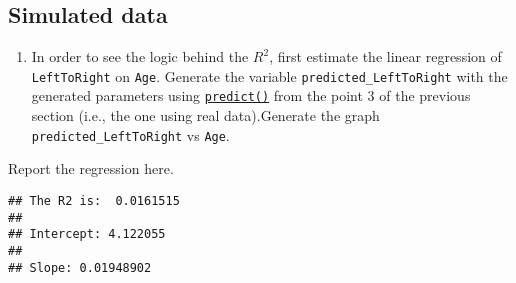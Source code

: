 \documentclass[
]{book}
\newenvironment{Shaded}{\begin{snugshade}}{\end{snugshade}}
\newcommand{\AttributeTok}[1]{\textcolor[rgb]{0.13,0.29,0.53}{#1}}
\newcommand{\DecValTok}[1]{\textcolor[rgb]{0.00,0.00,0.81}{#1}}
\newcommand{\FunctionTok}[1]{\textcolor[rgb]{0.13,0.29,0.53}{\textbf{#1}}}
\newcommand{\NormalTok}[1]{#1}
\newcommand{\OtherTok}[1]{\textcolor[rgb]{0.56,0.35,0.01}{#1}}
\newcommand{\SpecialCharTok}[1]{\textcolor[rgb]{0.81,0.36,0.00}{\textbf{#1}}}
\newcommand{\StringTok}[1]{\textcolor[rgb]{0.31,0.60,0.02}{#1}}
\providecommand{\tightlist}{%
  \setlength{\itemsep}{0pt}\setlength{\parskip}{0pt}}
\begin{document}
\hypertarget{simulated-data-1}{%
\subsection{Simulated data}\label{simulated-data-1}}

\begin{enumerate}
\def\labelenumi{\arabic{enumi}.}
\tightlist
\item
  In order to see the logic behind the \(R^2\), first estimate the linear regression of \texttt{LeftToRight} on \texttt{Age}. Generate the variable \texttt{predicted\_LeftToRight} with the generated parameters using \href{https://www.statology.org/r-lm-predict/}{\texttt{predict()}} from the point 3 of the previous section (i.e., the one using real data).Generate the graph \texttt{predicted\_LeftToRight} vs \texttt{Age}.
\end{enumerate}

Report the regression here.

\begin{Shaded}
\end{Shaded}

\begin{verbatim}
## The R2 is:  0.0161515 
## 
## Intercept: 4.122055 
## 
## Slope: 0.01948902
\end{verbatim}
\end{document}
